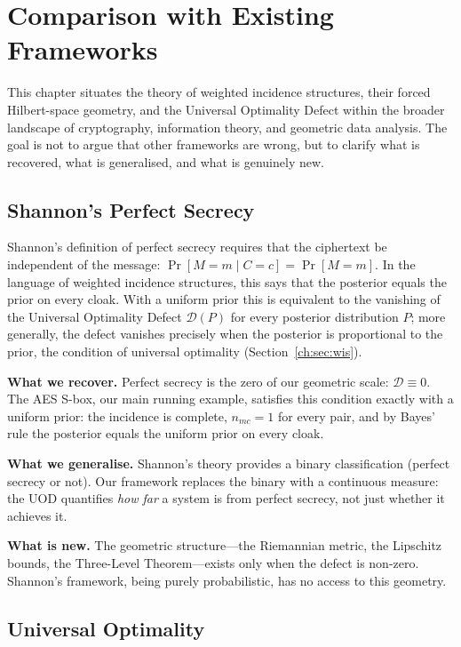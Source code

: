 \chapter[Comparison with Existing Frameworks]{Comparison with Existing Frameworks}\label{ch:sec:comparison-with-existing-frameworks}

This chapter situates the theory of weighted incidence structures,
their forced Hilbert-space geometry, and the Universal Optimality
Defect within the broader landscape of cryptography, information
theory, and geometric data analysis.  The goal is not to argue that
other frameworks are wrong, but to clarify what is recovered,
what is generalised, and what is genuinely new.

\section{Shannon's Perfect Secrecy}\label{ch:sec:shannon-perfect-secrecy}

Shannon's definition of perfect secrecy requires that the ciphertext
be independent of the message: $\Pr[M=m\mid C=c]=\Pr[M=m]$.
In the language of weighted incidence structures, this says that the
posterior equals the prior on every cloak.  With a uniform prior this
is equivalent to the vanishing of the Universal Optimality Defect
$\mathcal D(P)$ for every posterior distribution $P$; more generally,
the defect vanishes precisely when the posterior is proportional to
the prior, the condition of universal optimality (Section~\ref{ch:sec:wis}).

\textbf{What we recover.}
Perfect secrecy is the zero of our geometric scale: $\mathcal D\equiv0$.
The AES S-box, our main running example, satisfies this condition
exactly with a uniform prior: the incidence is complete, $n_{mc}=1$ for
every pair, and by Bayes' rule the posterior equals the uniform prior
on every cloak.

\textbf{What we generalise.}
Shannon's theory provides a binary classification (perfect secrecy
or not).  Our framework replaces the binary with a continuous measure:
the UOD quantifies \emph{how far} a system is from perfect secrecy,
not just whether it achieves it.

\textbf{What is new.}
The geometric structure---the Riemannian metric, the Lipschitz bounds,
the Three-Level Theorem---exists only when the defect is non-zero.
Shannon's framework, being purely probabilistic, has no access to this
geometry.

\section{Universal Optimality}\label{ch:sec:comparison-universal-optimality}

